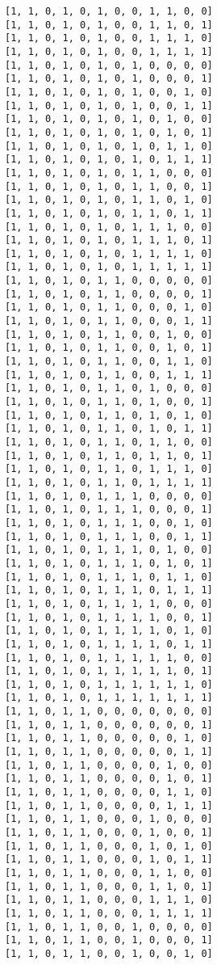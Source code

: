 \documentclass[11pt]{article}
\begin{document}
\begin{Verbatim}[commandchars=\\\{\}]
[1, 1, 0, 1, 0, 1, 0, 0, 1, 1, 0, 0]
[1, 1, 0, 1, 0, 1, 0, 0, 1, 1, 0, 1]
[1, 1, 0, 1, 0, 1, 0, 0, 1, 1, 1, 0]
[1, 1, 0, 1, 0, 1, 0, 0, 1, 1, 1, 1]
[1, 1, 0, 1, 0, 1, 0, 1, 0, 0, 0, 0]
[1, 1, 0, 1, 0, 1, 0, 1, 0, 0, 0, 1]
[1, 1, 0, 1, 0, 1, 0, 1, 0, 0, 1, 0]
[1, 1, 0, 1, 0, 1, 0, 1, 0, 0, 1, 1]
[1, 1, 0, 1, 0, 1, 0, 1, 0, 1, 0, 0]
[1, 1, 0, 1, 0, 1, 0, 1, 0, 1, 0, 1]
[1, 1, 0, 1, 0, 1, 0, 1, 0, 1, 1, 0]
[1, 1, 0, 1, 0, 1, 0, 1, 0, 1, 1, 1]
[1, 1, 0, 1, 0, 1, 0, 1, 1, 0, 0, 0]
[1, 1, 0, 1, 0, 1, 0, 1, 1, 0, 0, 1]
[1, 1, 0, 1, 0, 1, 0, 1, 1, 0, 1, 0]
[1, 1, 0, 1, 0, 1, 0, 1, 1, 0, 1, 1]
[1, 1, 0, 1, 0, 1, 0, 1, 1, 1, 0, 0]
[1, 1, 0, 1, 0, 1, 0, 1, 1, 1, 0, 1]
[1, 1, 0, 1, 0, 1, 0, 1, 1, 1, 1, 0]
[1, 1, 0, 1, 0, 1, 0, 1, 1, 1, 1, 1]
[1, 1, 0, 1, 0, 1, 1, 0, 0, 0, 0, 0]
[1, 1, 0, 1, 0, 1, 1, 0, 0, 0, 0, 1]
[1, 1, 0, 1, 0, 1, 1, 0, 0, 0, 1, 0]
[1, 1, 0, 1, 0, 1, 1, 0, 0, 0, 1, 1]
[1, 1, 0, 1, 0, 1, 1, 0, 0, 1, 0, 0]
[1, 1, 0, 1, 0, 1, 1, 0, 0, 1, 0, 1]
[1, 1, 0, 1, 0, 1, 1, 0, 0, 1, 1, 0]
[1, 1, 0, 1, 0, 1, 1, 0, 0, 1, 1, 1]
[1, 1, 0, 1, 0, 1, 1, 0, 1, 0, 0, 0]
[1, 1, 0, 1, 0, 1, 1, 0, 1, 0, 0, 1]
[1, 1, 0, 1, 0, 1, 1, 0, 1, 0, 1, 0]
[1, 1, 0, 1, 0, 1, 1, 0, 1, 0, 1, 1]
[1, 1, 0, 1, 0, 1, 1, 0, 1, 1, 0, 0]
[1, 1, 0, 1, 0, 1, 1, 0, 1, 1, 0, 1]
[1, 1, 0, 1, 0, 1, 1, 0, 1, 1, 1, 0]
[1, 1, 0, 1, 0, 1, 1, 0, 1, 1, 1, 1]
[1, 1, 0, 1, 0, 1, 1, 1, 0, 0, 0, 0]
[1, 1, 0, 1, 0, 1, 1, 1, 0, 0, 0, 1]
[1, 1, 0, 1, 0, 1, 1, 1, 0, 0, 1, 0]
[1, 1, 0, 1, 0, 1, 1, 1, 0, 0, 1, 1]
[1, 1, 0, 1, 0, 1, 1, 1, 0, 1, 0, 0]
[1, 1, 0, 1, 0, 1, 1, 1, 0, 1, 0, 1]
[1, 1, 0, 1, 0, 1, 1, 1, 0, 1, 1, 0]
[1, 1, 0, 1, 0, 1, 1, 1, 0, 1, 1, 1]
[1, 1, 0, 1, 0, 1, 1, 1, 1, 0, 0, 0]
[1, 1, 0, 1, 0, 1, 1, 1, 1, 0, 0, 1]
[1, 1, 0, 1, 0, 1, 1, 1, 1, 0, 1, 0]
[1, 1, 0, 1, 0, 1, 1, 1, 1, 0, 1, 1]
[1, 1, 0, 1, 0, 1, 1, 1, 1, 1, 0, 0]
[1, 1, 0, 1, 0, 1, 1, 1, 1, 1, 0, 1]
[1, 1, 0, 1, 0, 1, 1, 1, 1, 1, 1, 0]
[1, 1, 0, 1, 0, 1, 1, 1, 1, 1, 1, 1]
[1, 1, 0, 1, 1, 0, 0, 0, 0, 0, 0, 0]
[1, 1, 0, 1, 1, 0, 0, 0, 0, 0, 0, 1]
[1, 1, 0, 1, 1, 0, 0, 0, 0, 0, 1, 0]
[1, 1, 0, 1, 1, 0, 0, 0, 0, 0, 1, 1]
[1, 1, 0, 1, 1, 0, 0, 0, 0, 1, 0, 0]
[1, 1, 0, 1, 1, 0, 0, 0, 0, 1, 0, 1]
[1, 1, 0, 1, 1, 0, 0, 0, 0, 1, 1, 0]
[1, 1, 0, 1, 1, 0, 0, 0, 0, 1, 1, 1]
[1, 1, 0, 1, 1, 0, 0, 0, 1, 0, 0, 0]
[1, 1, 0, 1, 1, 0, 0, 0, 1, 0, 0, 1]
[1, 1, 0, 1, 1, 0, 0, 0, 1, 0, 1, 0]
[1, 1, 0, 1, 1, 0, 0, 0, 1, 0, 1, 1]
[1, 1, 0, 1, 1, 0, 0, 0, 1, 1, 0, 0]
[1, 1, 0, 1, 1, 0, 0, 0, 1, 1, 0, 1]
[1, 1, 0, 1, 1, 0, 0, 0, 1, 1, 1, 0]
[1, 1, 0, 1, 1, 0, 0, 0, 1, 1, 1, 1]
[1, 1, 0, 1, 1, 0, 0, 1, 0, 0, 0, 0]
[1, 1, 0, 1, 1, 0, 0, 1, 0, 0, 0, 1]
[1, 1, 0, 1, 1, 0, 0, 1, 0, 0, 1, 0]

\end{Verbatim}
\end{document}

